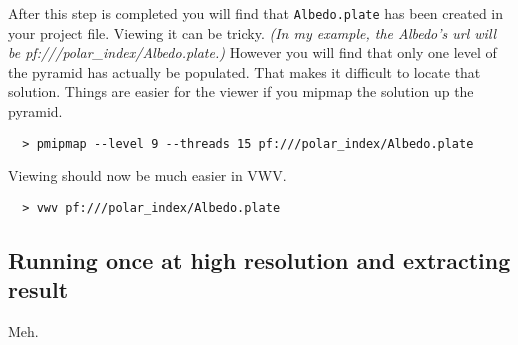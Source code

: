 After this step is completed you will find that \texttt{Albedo.plate}
has been created in your project file. Viewing it can be
tricky. \emph{(In my example, the Albedo's url will be
  pf:///polar\_index/Albedo.plate.)} However you will find that only
one level of the pyramid has actually be populated. That makes it
difficult to locate that solution. Things are easier for the viewer if
you mipmap the solution up the pyramid.

\begin{verbatim}
  > pmipmap --level 9 --threads 15 pf:///polar_index/Albedo.plate
\end{verbatim}

Viewing should now be much easier in VWV.

\begin{verbatim}
  > vwv pf:///polar_index/Albedo.plate
\end{verbatim}

\subsection{Running once at high resolution and extracting result}

Meh.




